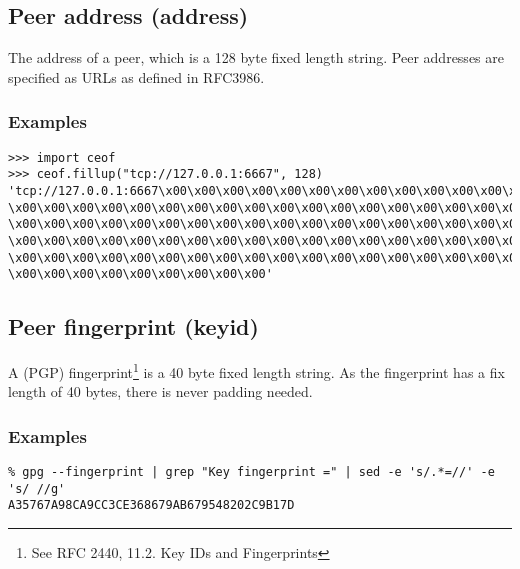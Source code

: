 \subsection{Peer address (address)}
The address of a peer, which is a 128 byte fixed length string. 
Peer addresses are specified as URLs as defined in RFC3986\cite{rfc3986}. 
\subsubsection{Examples}
\begin{verbatim}
>>> import ceof
>>> ceof.fillup("tcp://127.0.0.1:6667", 128)
'tcp://127.0.0.1:6667\x00\x00\x00\x00\x00\x00\x00\x00\x00\x00\x00\x00\x00\x00\x00
\x00\x00\x00\x00\x00\x00\x00\x00\x00\x00\x00\x00\x00\x00\x00\x00\x00\x00\x00\x00\x00
\x00\x00\x00\x00\x00\x00\x00\x00\x00\x00\x00\x00\x00\x00\x00\x00\x00\x00\x00\x00\x00
\x00\x00\x00\x00\x00\x00\x00\x00\x00\x00\x00\x00\x00\x00\x00\x00\x00\x00\x00\x00\x00
\x00\x00\x00\x00\x00\x00\x00\x00\x00\x00\x00\x00\x00\x00\x00\x00\x00\x00\x00\x00\x00
\x00\x00\x00\x00\x00\x00\x00\x00\x00'
\end{verbatim}
\subsection{Peer fingerprint (keyid)}
A (PGP) fingerprint\footnote{See RFC 2440\cite{rfc2440}, 11.2. Key IDs and Fingerprints}
is a 40 byte fixed length string. As the fingerprint has a fix length of
40 bytes, there is never padding needed.
\subsubsection{Examples}
\begin{verbatim}
% gpg --fingerprint | grep "Key fingerprint =" | sed -e 's/.*=//' -e 's/ //g'
A35767A98CA9CC3CE368679AB679548202C9B17D
\end{verbatim}
